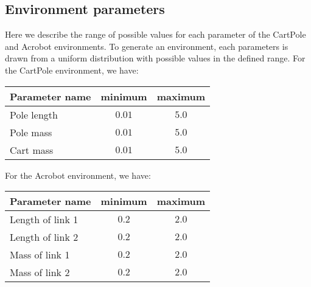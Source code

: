 \begin{appendices}
\section{Environment parameters} %
\label{sec:environment_parameters}
Here we describe the range of possible values for each parameter of the CartPole and Acrobot environments. To generate an environment, each parameters is drawn from a uniform distribution with possible values in the defined range. For the CartPole environment, we have:
\begin{table}[H]
    \centering
    \begin{tabular}{l|cc}
    \hline
    \textbf{Parameter name} & \textbf{minimum} & \textbf{maximum} \\
    \hline
        Pole length & $0.01$ & $5.0$ \\
        Pole mass & $0.01$ & $5.0$ \\
        Cart mass & $0.01$ & $5.0$ \\
    \hline
    \end{tabular}
\end{table}
For the Acrobot environment, we have:
\begin{table}[H]
    \centering
    \begin{tabular}{l|cc}
    \hline
    \textbf{Parameter name} & \textbf{minimum} & \textbf{maximum} \\
    \hline
        Length of link 1 & $0.2$ & $2.0$ \\
        Length of link 2 & $0.2$ & $2.0$ \\
        Mass of link 1 & $0.2$ & $2.0$ \\
        Mass of link 2 & $0.2$ & $2.0$ \\
    \hline
    \end{tabular}
\end{table}

\end{appendices}
